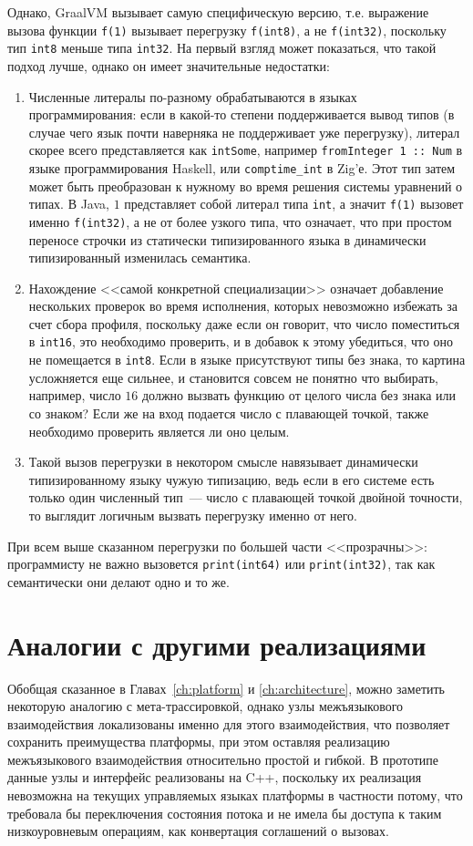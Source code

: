 \documentclass[times
]{itmo-student-thesis}
\begin{document}
Однако, GraalVM вызывает самую специфическую версию, т.е. выражение вызова функции \texttt{f(1)} вызывает перегрузку \texttt{f(int8)}, а не \texttt{f(int32)}, поскольку тип \texttt{int8} меньше типа \texttt{int32}. На первый взгляд может показаться, что такой подход лучше, однако он имеет значительные недостатки:
\begin{enumerate}
	\item Численные литералы по-разному обрабатываются в языках программирования: если в какой-то степени поддерживается вывод типов (в случае чего язык почти наверняка не поддерживает уже перегрузку), литерал скорее всего представляется как \texttt{intSome}, например \texttt{fromInteger 1 :: Num} в языке программирования Haskell, или \texttt{comptime\_int} в Zig'е. Этот тип затем может быть преобразован к нужному во время решения системы уравнений о типах. В Java, $1$ представляет собой литерал типа \texttt{int}, а значит \texttt{f(1)} вызовет именно \texttt{f(int32)}, а не от более узкого типа, что означает, что при простом переносе строчки из статически типизированного языка в динамически типизированный изменилась семантика.
	\item Нахождение <<самой конкретной специализации>> означает добавление нескольких проверок во время исполнения, которых невозможно избежать за счет сбора профиля, поскольку даже если он говорит, что число поместиться в \texttt{int16}, это необходимо проверить, и в добавок к этому убедиться, что оно не помещается в \texttt{int8}. Если в языке присутствуют типы без знака, то картина усложняется еще сильнее, и становится совсем не понятно что выбирать, например, число $16$ должно вызвать функцию от целого числа без знака или со знаком? Если же на вход подается число с плавающей точкой, также необходимо проверить является ли оно целым.
	\item Такой вызов перегрузки в некотором смысле навязывает динамически типизированному языку чужую типизацию, ведь если в его системе есть только один численный тип~--- число с плавающей точкой двойной точности, то выглядит логичным вызвать перегрузку именно от него.
\end{enumerate}

При всем выше сказанном перегрузки по большей части <<прозрачны>>: программисту не важно вызовется \texttt{print(int64)} или \texttt{print(int32)}, так как семантически они делают одно и то же.

\section{Аналогии с другими реализациями}
Обобщая сказанное в Главах~\ref{ch:platform} и \ref{ch:architecture}, можно заметить некоторую аналогию с мета-трассировкой, однако узлы межъязыкового взаимодействия локализованы именно для этого взаимодействия, что позволяет сохранить преимущества платформы, при этом оставляя реализацию межъязыкового взаимодействия относительно простой и гибкой. В прототипе данные узлы и интерфейс реализованы на C++, поскольку их реализация невозможна на текущих управляемых языках платформы в частности потому, что требовала бы переключения состояния потока и не имела бы доступа к таким низкоуровневым операциям, как конвертация соглашений о вызовах.
\end{document}

